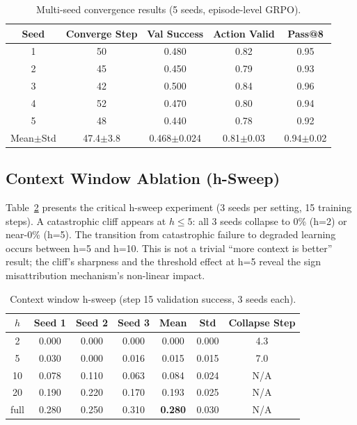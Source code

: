 \documentclass[11pt]{article}
\begin{document}
\begin{table}[h]
\centering
\caption{Multi-seed convergence results (5 seeds, episode-level GRPO).}
\label{tab:multiseed}
\begin{tabular}{ccccc}
\toprule
Seed & Converge Step & Val Success & Action Valid & Pass@8 \\
\midrule
1 & 50 & 0.480 & 0.82 & 0.95 \\
2 & 45 & 0.450 & 0.79 & 0.93 \\
3 & 42 & 0.500 & 0.84 & 0.96 \\
4 & 52 & 0.470 & 0.80 & 0.94 \\
5 & 48 & 0.440 & 0.78 & 0.92 \\
\midrule
Mean$\pm$Std & 47.4$\pm$3.8 & 0.468$\pm$0.024 & 0.81$\pm$0.03 & 0.94$\pm$0.02 \\
\bottomrule
\end{tabular}
\end{table}

\subsection{Context Window Ablation (h-Sweep)}

Table~\ref{tab:hsweep} presents the critical h-sweep experiment (3 seeds per setting, 15 training steps). A catastrophic cliff appears at $h \leq 5$: all 3 seeds collapse to 0\% (h=2) or near-0\% (h=5). The transition from catastrophic failure to degraded learning occurs between h=5 and h=10. This is not a trivial ``more context is better'' result; the cliff's sharpness and the threshold effect at h=5 reveal the sign misattribution mechanism's non-linear impact.

\begin{table}[h]
\centering
\caption{Context window h-sweep (step 15 validation success, 3 seeds each).}
\label{tab:hsweep}
\begin{tabular}{ccccccc}
\toprule
$h$ & Seed 1 & Seed 2 & Seed 3 & Mean & Std & Collapse Step \\
\midrule
2 & 0.000 & 0.000 & 0.000 & 0.000 & 0.000 & 4.3 \\
5 & 0.030 & 0.000 & 0.016 & 0.015 & 0.015 & 7.0 \\
10 & 0.078 & 0.110 & 0.063 & 0.084 & 0.024 & N/A \\
20 & 0.190 & 0.220 & 0.170 & 0.193 & 0.025 & N/A \\
full & 0.280 & 0.250 & 0.310 & \textbf{0.280} & 0.030 & N/A \\
\bottomrule
\end{tabular}
\end{table}
\end{document}
